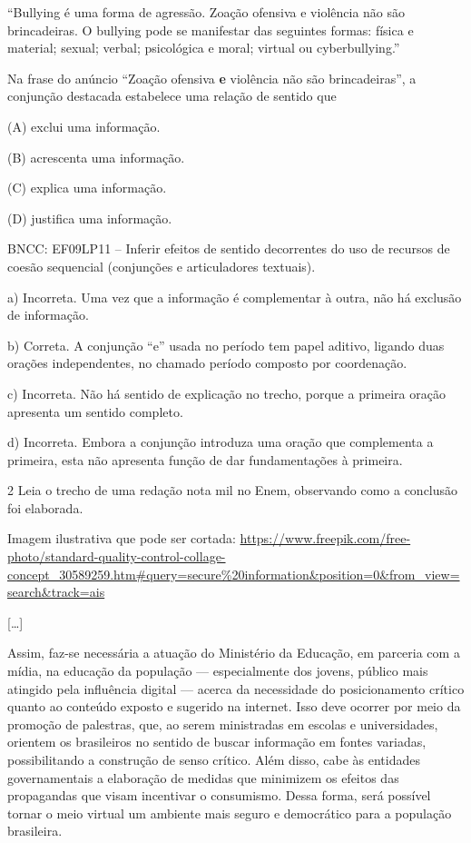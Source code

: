 \begin{itemize}
\begin{itemize}
{\begin{itemize}
\begin{itemize}
``Bullying é uma forma de agressão. Zoação ofensiva e violência não são
brincadeiras. O bullying pode se manifestar das seguintes formas: física
e material; sexual; verbal; psicológica e moral; virtual ou
cyberbullying.''

Na frase do anúncio ``Zoação ofensiva \textbf{e} violência não são
brincadeiras'', a conjunção destacada estabelece uma relação de sentido
que

(A) exclui uma informação.

(B) acrescenta uma informação.

(C) explica uma informação.

(D) justifica uma informação.

BNCC: EF09LP11 -- Inferir efeitos de sentido decorrentes do uso de
recursos de coesão sequencial (conjunções e articuladores textuais).

a) Incorreta. Uma vez que a informação é complementar à outra, não há
exclusão de informação.

b) Correta. A conjunção ``e'' usada no período tem papel aditivo,
ligando duas orações independentes, no chamado período composto por
coordenação.

c) Incorreta. Não há sentido de explicação no trecho, porque a primeira
oração apresenta um sentido completo.

d) Incorreta. Embora a conjunção introduza uma oração que complementa a
primeira, esta não apresenta função de dar fundamentações à primeira.

\num{2} Leia o trecho de uma redação nota mil no Enem, observando como a
conclusão foi elaborada.

Imagem ilustrativa que pode ser cortada:
\url{https://www.freepik.com/free-photo/standard-quality-control-collage-concept_30589259.htm\#query=secure\%20information\&position=0\&from_view=search\&track=ais}

{[}\ldots{}{]}

Assim, faz-se necessária a atuação do Ministério da Educação, em
parceria com a mídia, na educação da população --- especialmente dos
jovens, público mais atingido pela influência digital --- acerca da
necessidade do posicionamento crítico quanto ao conteúdo exposto e
sugerido na internet. Isso deve ocorrer por meio da promoção de
palestras, que, ao serem ministradas em escolas e universidades,
orientem os brasileiros no sentido de buscar informação em fontes
variadas, possibilitando a construção de senso crítico. Além disso, cabe
às entidades governamentais a elaboração de medidas que minimizem os
efeitos das propagandas que visam incentivar o consumismo. Dessa forma,
será possível tornar o meio virtual um ambiente mais seguro e
democrático para a população brasileira.


\end{itemize}
\end{itemize}}
\end{itemize}
\end{itemize}
